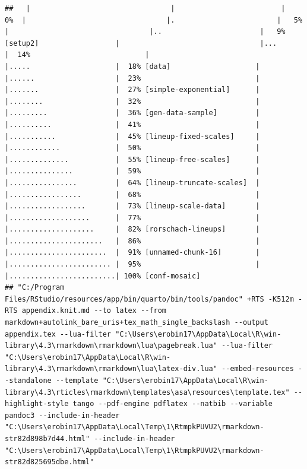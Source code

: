 \documentclass[12pt]{article}
\begin{document}
\begin{verbatim}
##   |                                 |                         |   0%  |                                 |.                        |   5%                           |                                 |..                       |   9% [setup2]                  |                                 |...                      |  14%                           |                                 |.....                    |  18% [data]                    |                                 |......                   |  23%                           |                                 |.......                  |  27% [simple-exponential]      |                                 |........                 |  32%                           |                                 |.........                |  36% [gen-data-sample]         |                                 |..........               |  41%                           |                                 |...........              |  45% [lineup-fixed-scales]     |                                 |............             |  50%                           |                                 |..............           |  55% [lineup-free-scales]      |                                 |...............          |  59%                           |                                 |................         |  64% [lineup-truncate-scales]  |                                 |.................        |  68%                           |                                 |..................       |  73% [lineup-scale-data]       |                                 |...................      |  77%                           |                                 |....................     |  82% [rorschach-lineups]       |                                 |......................   |  86%                           |                                 |.......................  |  91% [unnamed-chunk-16]        |                                 |........................ |  95%                           |                                 |.........................| 100% [conf-mosaic]                                                                                                          
## "C:/Program Files/RStudio/resources/app/bin/quarto/bin/tools/pandoc" +RTS -K512m -RTS appendix.knit.md --to latex --from markdown+autolink_bare_uris+tex_math_single_backslash --output appendix.tex --lua-filter "C:\Users\erobin17\AppData\Local\R\win-library\4.3\rmarkdown\rmarkdown\lua\pagebreak.lua" --lua-filter "C:\Users\erobin17\AppData\Local\R\win-library\4.3\rmarkdown\rmarkdown\lua\latex-div.lua" --embed-resources --standalone --template "C:\Users\erobin17\AppData\Local\R\win-library\4.3\rticles\rmarkdown\templates\asa\resources\template.tex" --highlight-style tango --pdf-engine pdflatex --natbib --variable pandoc3 --include-in-header "C:\Users\erobin17\AppData\Local\Temp\1\RtmpkPUVU2\rmarkdown-str82d898b7d44.html" --include-in-header "C:\Users\erobin17\AppData\Local\Temp\1\RtmpkPUVU2\rmarkdown-str82d825695dbe.html"
\end{verbatim}


\renewcommand\refname{References}

\end{document}

